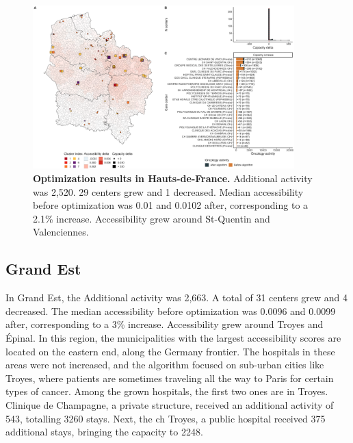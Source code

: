 \begin{figure}[H]
    \includegraphics[width=0.9\textwidth]{images/camion/optim_region/optim_Hauts-de-France.png}
    \centering
    \caption{ \textbf{Optimization results in Hauts-de-France.} Additional
        activity was 2,520. 29 centers grew and 1 decreased. Median
        accessibility before optimization was 0.01 and 0.0102 after,
        corresponding to a 2.1\% increase. Accessibility grew around St-Quentin
        and Valenciennes. }
\end{figure}

\subsection*{Grand Est}

In Grand Est, the Additional activity was 2,663. A total of 31 centers grew and 4
decreased. The median accessibility before optimization was 0.0096 and
0.0099 after, corresponding to a 3\% increase. Accessibility grew around
Troyes and Épinal. In this region, the municipalities with the largest accessibility
scores are located on the eastern end, along the Germany frontier. The hospitals
in these areas were not increased, and the algorithm focused on sub-urban
cities like Troyes, where patients are sometimes traveling all the way to Paris
for certain types of cancer. Among the grown hospitals, the first two ones are
in Troyes. Clinique de Champagne, a private structure, received an additional
activity of 543, totalling 3260 stays. Next, the \ac{ch} Troyes, a public hospital
received 375 additional stays, bringing the capacity to 2248.

